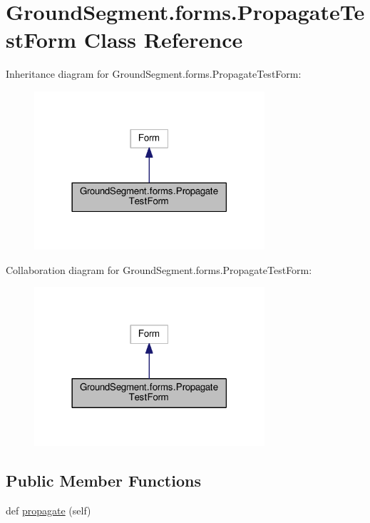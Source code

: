\hypertarget{class_ground_segment_1_1forms_1_1_propagate_test_form}{}\section{Ground\+Segment.\+forms.\+Propagate\+Test\+Form Class Reference}
\label{class_ground_segment_1_1forms_1_1_propagate_test_form}


Inheritance diagram for Ground\+Segment.\+forms.\+Propagate\+Test\+Form\+:\nopagebreak
\begin{figure}[H]
\begin{center}
\leavevmode
\includegraphics[width=242pt]{class_ground_segment_1_1forms_1_1_propagate_test_form__inherit__graph}
\end{center}
\end{figure}


Collaboration diagram for Ground\+Segment.\+forms.\+Propagate\+Test\+Form\+:\nopagebreak
\begin{figure}[H]
\begin{center}
\leavevmode
\includegraphics[width=242pt]{class_ground_segment_1_1forms_1_1_propagate_test_form__coll__graph}
\end{center}
\end{figure}
\subsection*{Public Member Functions}
\begin{DoxyCompactItemize}
\item 
def \hyperlink{class_ground_segment_1_1forms_1_1_propagate_test_form_af9002912a85471d6b5a058f39b435309}{propagate} (self)
\end{DoxyCompactItemize}


